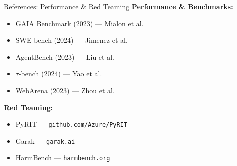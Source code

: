 \documentclass{beamer}       %
\begin{document}
\begin{frame}{References: Performance \& Red Teaming}
    \small
    \textbf{Performance \& Benchmarks:}
    \begin{itemize}
        \item GAIA Benchmark (2023) --- Mialon et al.
        \item SWE-bench (2024) --- Jimenez et al.
        \item AgentBench (2023) --- Liu et al.
        \item $\tau$-bench (2024) --- Yao et al.
        \item WebArena (2023) --- Zhou et al.
    \end{itemize}
    \vspace{0.2cm}
    \textbf{Red Teaming:}
    \begin{itemize}
        \item PyRIT --- \texttt{github.com/Azure/PyRIT}
        \item Garak --- \texttt{garak.ai}
        \item HarmBench --- \texttt{harmbench.org}
    \end{itemize}
\end{frame}
\end{document}
